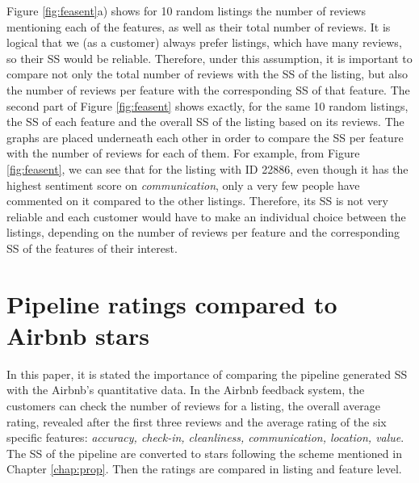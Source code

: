 Figure \ref{fig:feasent}a) shows for 10 random listings the number of reviews mentioning each of the features, as well as their total number of reviews. It is logical that we (as a customer) always prefer listings, which have many reviews, so their SS would be reliable. Therefore, under this assumption, it is important to compare not only the total number of reviews with the SS of the listing, but also the number of reviews per feature with the corresponding SS of that feature. The second part of Figure \ref{fig:feasent} shows exactly, for the same 10 random listings, the SS of each feature and the overall SS of the listing based on its reviews. The graphs are placed underneath each other in order to compare the SS per feature with the number of reviews for each of them. For example, from Figure \ref{fig:feasent}, we can see that for the listing with ID 22886, even though it has the highest sentiment score on \textit{communication}, only a very few people have commented on it compared to the other listings. Therefore, its SS is not very reliable and each customer would have to make an individual choice between the listings, depending on the number of reviews per feature and the corresponding SS of the features of their interest. 

\section{Pipeline ratings compared to Airbnb stars}
In this paper, it is stated the importance of comparing the pipeline generated SS with the Airbnb's quantitative data. In the Airbnb feedback system, the customers can check the number of reviews for a listing, the overall average rating, revealed after the first three reviews and the average rating of the six specific features: \textit{accuracy, check-in, cleanliness, communication, location, value}. The SS of the pipeline are converted to stars following the scheme mentioned in Chapter \ref{chap:prop}. Then the ratings are compared in listing and feature level. 
